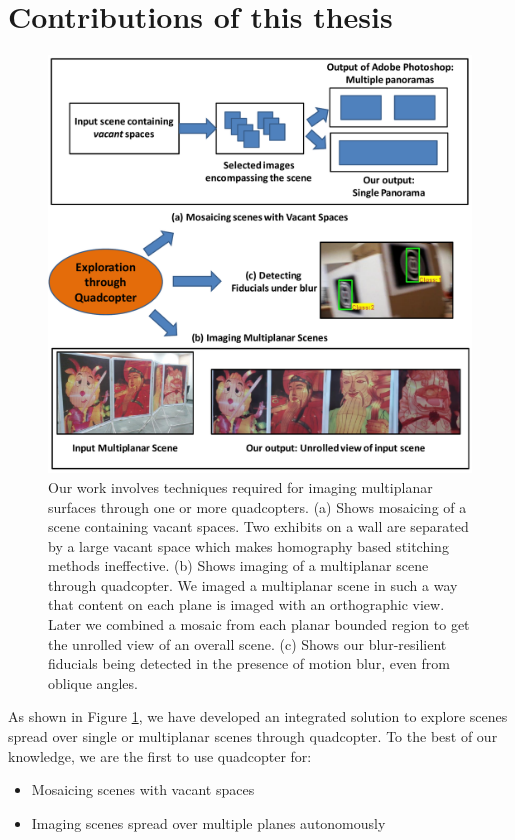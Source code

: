 \section{Contributions of this thesis}
\begin{figure}[h!]
\centering
\includegraphics[width=0.98\linewidth]{figures/contributions2}
\caption[Contributions]{Our work involves techniques required for imaging
multiplanar surfaces through one or more quadcopters. (a) Shows mosaicing of a scene containing
vacant spaces. Two exhibits on a wall are separated by  a large vacant space
which makes homography based stitching methods ineffective. (b) Shows imaging
of a multiplanar scene through quadcopter. We imaged a multiplanar scene in such
a way that content on each plane is imaged with an orthographic view. Later we
combined a mosaic from each planar bounded region to get the  unrolled view of
an overall scene. (c) Shows our blur-resilient fiducials being detected in the
presence of motion blur, even from oblique angles.}
\label{fig:contributions}
\end{figure}

As shown in Figure \ref{fig:contributions}, we have developed an integrated solution to
explore scenes spread over single or multiplanar scenes through quadcopter. To
the best of our knowledge, we are the first to use quadcopter for:
\begin{itemize}
  \item Mosaicing scenes with vacant spaces  
  \item Imaging scenes spread over multiple planes autonomously   
\end{itemize}

